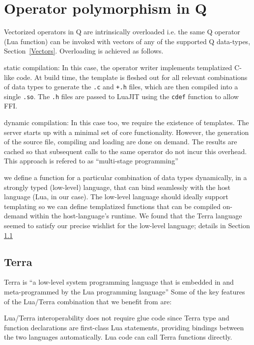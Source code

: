 \section{Operator polymorphism in Q}
\label{polymorphism}

Vectorized operators in Q are intrinsically overloaded i.e. the same Q operator
(Lua function) can be invoked with vectors of any of the supported Q data-types,
Section~\ref{Vectors}.
Overloading is achieved as follows.
\be
\item static compilation: In this case, the operator writer implements
  templatized C-like code. At build time, the template is fleshed out for all
  relevant combinations of data types to generate the {\tt .c} and {\tt +.h}
  files, which are then compiled into a single {\tt .so}. The {\tt .h} files
  are passed to LuaJIT using the {\tt cdef} function to allow FFI.
\item dynamic compilation: 
  In this case too, we require the existence of templates. 
  The server starts up with a minimal set of core functionality. 
  However, the generation of the source file, compiling and loading
  are done on demand. The results are cached
  so that subsequent calls to the same operator do not incur this overhead.
  This approach is refered to as  ``multi-stage programming''


\item we define a function for a particular combination of data types
  dynamically, in a strongly typed (low-level) language, that can bind seamlessly
  with the host language (Lua, in our case). The low-level language should ideally support templating so we can define templatized functions that can be compiled on-demand within the host-language's runtime.
  We found that the Terra language seemed to satisfy our precise wishlist for the low-level language; details in Section \ref{Terra} 
  \ee

\subsection{Terra} 
\label{Terra} 

Terra is ``a low-level system programming language that is embedded in and
meta-programmed by the Lua programming language'' \cite{devito2015}
Some of the key features of the Lua/Terra combination that we benefit 
from are:
\be
\item Lua/Terra interoperability does not require glue code since Terra type and function declarations are first-class Lua statements, providing bindings between the two languages automatically. Lua code can call Terra functions directly.

